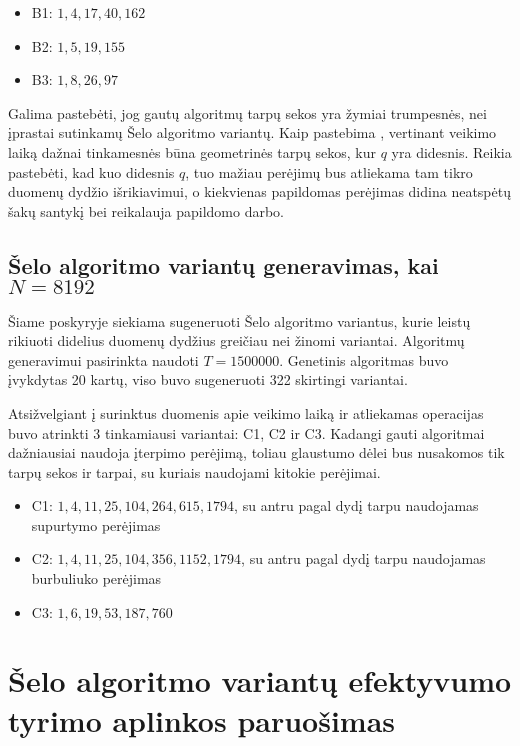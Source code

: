 \documentclass{VUMIFInfBakalaurinis}
\begin{document}
\begin{itemize}
  \item B1: $1, 4, 17, 40, 162$
  \item B2: $1, 5, 19, 155$
  \item B3: $1, 8, 26, 97 $
\end{itemize}

Galima pastebėti, jog gautų algoritmų tarpų sekos yra žymiai trumpesnės, nei įprastai sutinkamų Šelo algoritmo variantų.
Kaip pastebima \cite{Radavičius_Baranauskas_2013}, vertinant veikimo laiką dažnai tinkamesnės būna geometrinės tarpų sekos, kur $q$ yra didesnis.
Reikia pastebėti, kad kuo didesnis $q$, tuo mažiau perėjimų bus atliekama tam tikro duomenų dydžio išrikiavimui,
o kiekvienas papildomas perėjimas didina neatspėtų šakų santykį bei reikalauja papildomo darbo.  

\subsection{Šelo algoritmo variantų generavimas, kai $N = 8192$}

Šiame poskyryje siekiama sugeneruoti Šelo algoritmo variantus,
kurie leistų rikiuoti didelius duomenų dydžius greičiau nei žinomi variantai.
Algoritmų generavimui pasirinkta naudoti $T = 1500000$.
Genetinis algoritmas buvo įvykdytas 20 kartų, viso buvo sugeneruoti 322 skirtingi variantai.

Atsižvelgiant į surinktus duomenis apie veikimo laiką ir atliekamas operacijas buvo atrinkti 3 tinkamiausi variantai: C1, C2 ir C3.
Kadangi gauti algoritmai dažniausiai naudoja įterpimo perėjimą, toliau glaustumo dėlei bus nusakomos tik tarpų sekos ir tarpai, su kuriais naudojami kitokie perėjimai.

\begin{itemize}
  \item C1: $1, 4, 11, 25, 104, 264, 615, 1794$, su antru pagal dydį tarpu naudojamas supurtymo perėjimas
  \item C2: $1, 4, 11, 25, 104, 356, 1152, 1794$, su antru pagal dydį tarpu naudojamas burbuliuko perėjimas
  \item C3: $1, 6, 19, 53, 187, 760 $
\end{itemize}

\section{Šelo algoritmo variantų efektyvumo tyrimo aplinkos paruošimas}
\end{document}
